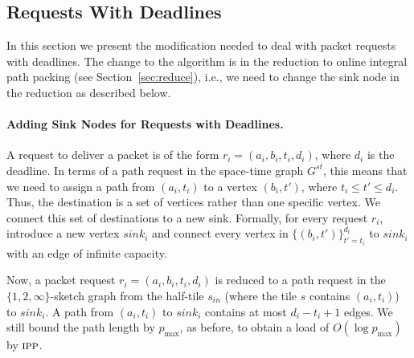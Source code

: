 \documentclass[11pt]{article}
\newcommand{\route}{\text{\sc{ipp}}}
\newcommand{\IPP}{\route}
\newcommand{\pmax}{p_{\max}}
\newenvironment{proof sketch}[1]{\noindent {\emph{Proof sketch of #1:}}}{\hfill \qed}
\begin{document}
\subsection{Requests With Deadlines}\label{sec:d_i}
In this section we present the modification needed to deal with packet
requests with deadlines.  The change to the algorithm is in the
reduction to online integral path packing (see Section~\ref{sec:reduce}), i.e., we need to change the sink node in the reduction as described below.

\newcommand{\sink}{\textit{sink}}

\paragraph{Adding Sink Nodes for Requests with Deadlines.}
A request to deliver a packet is of the form $r_i=(a_i,b_i,t_i,d_i)$,
where $d_i$ is the deadline.  In terms of a path request in the space-time
graph $G^{st}$, this means that we need to assign a path from
$(a_i,t_i)$ to a vertex $(b_i,t')$, where $t_i \leq t'\leq d_i$.
Thus, the destination is a set of vertices rather than one specific
vertex.
We connect this set of destinations to a new sink. Formally, for every
request $r_i$, introduce a new vertex $\sink_i$ and connect every vertex
in $\{(b_i,t')\}_{t'=t_i}^{d_i}$ to $\sink_i$ with an edge of infinite
capacity.

Now, a packet request $r_i=(a_i,b_i,t_i,d_i)$ is reduced to a path
request in the $\{1,2,\infty\}$-sketch graph from the half-tile
$s_{in}$ (where the tile $s$ contains $(a_i,t_i)$) to $\sink_i$.
A path from $(a_i,t_i)$ to $\sink_i$ contains at most $d_i-t_i+1$ edges. We still bound the path length by $\pmax$, as before, to obtain a load of $O(\log \pmax)$ by $\IPP$.
\end{document}
